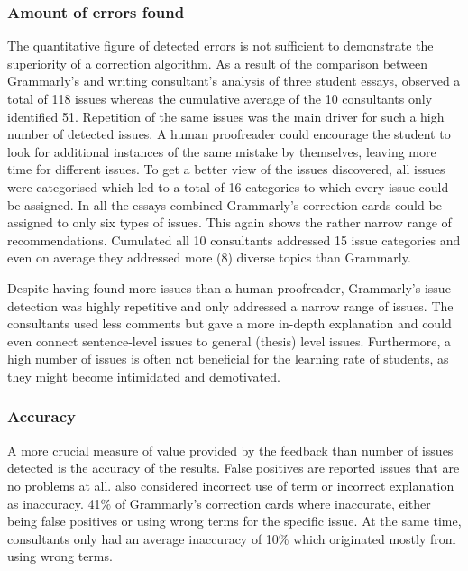 \documentclass[runningheads]{llncs}
\let\OldTextregistered\textregistered
\renewcommand{\textregistered}{\OldTextregistered\xspace}%
\begin{document}
\subsubsection{Amount of errors found}
The quantitative figure of detected errors is not sufficient to demonstrate the superiority of a correction algorithm. As a result of the comparison between Grammarly\textregistered's and writing consultant's analysis of three student essays, \textcite{dembsey_closing_2017} observed a total of 118 issues whereas the cumulative average of the 10 consultants only identified 51. Repetition of the same issues was the main driver for such a high number of detected issues. A human proofreader could encourage the student to look for additional instances of the same mistake by themselves, leaving more time for different issues. To get a better view of the issues discovered, all issues were categorised which led to a total of 16 categories to which every issue could be assigned. In all the essays combined Grammarly\textregistered's correction cards could be assigned to only six types of issues. This again shows the rather narrow range of recommendations. Cumulated all 10 consultants addressed 15 issue categories and even on average they addressed more (8) diverse topics than Grammarly\textregistered.

Despite having found more issues than a human proofreader, Grammarly\textregistered's issue detection was highly repetitive and only addressed a narrow range of issues. The consultants used less comments but gave a more in-depth explanation and could even connect sentence-level issues to general (thesis) level issues. Furthermore, a high number of issues is often not beneficial for the learning rate of students, as they might become intimidated and demotivated. 
\citep{dembsey_closing_2017}


\subsubsection{Accuracy}
A more crucial measure of value provided by the feedback than number of issues detected is the accuracy of the results. False positives are reported issues that are no problems at all. \textcite{dembsey_closing_2017} also considered incorrect use of term or incorrect explanation as inaccuracy. 41\% of Grammarly\textregistered's correction cards where inaccurate, either being false positives or using wrong terms for the specific issue. At the same time, consultants only had an average inaccuracy of 10\% which originated mostly from using wrong terms.
\citep{dembsey_closing_2017}
\end{document}
